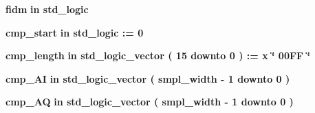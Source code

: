\begin{DoxyCompactItemize}
\item 
{\bf fidm}  {\bfseries {\bfseries \textcolor{keywordflow}{in}\textcolor{vhdlchar}{ }}} {\bfseries \textcolor{comment}{std\+\_\+logic}\textcolor{vhdlchar}{ }} 
\item 
{\bf cmp\+\_\+start}  {\bfseries {\bfseries \textcolor{keywordflow}{in}\textcolor{vhdlchar}{ }}} {\bfseries \textcolor{comment}{std\+\_\+logic}\textcolor{vhdlchar}{ }\textcolor{vhdlchar}{ }\textcolor{vhdlchar}{\+:}\textcolor{vhdlchar}{=}\textcolor{vhdlchar}{ }\textcolor{vhdlchar}{ }\textcolor{vhdlchar}{\textquotesingle{}}\textcolor{vhdlchar}{ } \textcolor{vhdldigit}{0} \textcolor{vhdlchar}{ }\textcolor{vhdlchar}{\textquotesingle{}}\textcolor{vhdlchar}{ }} 
\item 
{\bf cmp\+\_\+length}  {\bfseries {\bfseries \textcolor{keywordflow}{in}\textcolor{vhdlchar}{ }}} {\bfseries \textcolor{comment}{std\+\_\+logic\+\_\+vector}\textcolor{vhdlchar}{ }\textcolor{vhdlchar}{(}\textcolor{vhdlchar}{ }\textcolor{vhdlchar}{ } \textcolor{vhdldigit}{15} \textcolor{vhdlchar}{ }\textcolor{keywordflow}{downto}\textcolor{vhdlchar}{ }\textcolor{vhdlchar}{ } \textcolor{vhdldigit}{0} \textcolor{vhdlchar}{ }\textcolor{vhdlchar}{)}\textcolor{vhdlchar}{ }\textcolor{vhdlchar}{ }\textcolor{vhdlchar}{ }\textcolor{vhdlchar}{\+:}\textcolor{vhdlchar}{=}\textcolor{vhdlchar}{ }\textcolor{vhdlchar}{ }\textcolor{vhdlchar}{x}\textcolor{vhdlchar}{ }\textcolor{keyword}{\char`\"{} 00\+F\+F \char`\"{}}\textcolor{vhdlchar}{ }} 
\item 
{\bf cmp\+\_\+\+AI}  {\bfseries {\bfseries \textcolor{keywordflow}{in}\textcolor{vhdlchar}{ }}} {\bfseries \textcolor{comment}{std\+\_\+logic\+\_\+vector}\textcolor{vhdlchar}{ }\textcolor{vhdlchar}{(}\textcolor{vhdlchar}{ }\textcolor{vhdlchar}{ }\textcolor{vhdlchar}{ }\textcolor{vhdlchar}{ }{\bfseries {\bf smpl\+\_\+width}} \textcolor{vhdlchar}{-\/}\textcolor{vhdlchar}{ } \textcolor{vhdldigit}{1} \textcolor{vhdlchar}{ }\textcolor{keywordflow}{downto}\textcolor{vhdlchar}{ }\textcolor{vhdlchar}{ } \textcolor{vhdldigit}{0} \textcolor{vhdlchar}{ }\textcolor{vhdlchar}{)}\textcolor{vhdlchar}{ }} 
\item 
{\bf cmp\+\_\+\+AQ}  {\bfseries {\bfseries \textcolor{keywordflow}{in}\textcolor{vhdlchar}{ }}} {\bfseries \textcolor{comment}{std\+\_\+logic\+\_\+vector}\textcolor{vhdlchar}{ }\textcolor{vhdlchar}{(}\textcolor{vhdlchar}{ }\textcolor{vhdlchar}{ }\textcolor{vhdlchar}{ }\textcolor{vhdlchar}{ }{\bfseries {\bf smpl\+\_\+width}} \textcolor{vhdlchar}{-\/}\textcolor{vhdlchar}{ } \textcolor{vhdldigit}{1} \textcolor{vhdlchar}{ }\textcolor{keywordflow}{downto}\textcolor{vhdlchar}{ }\textcolor{vhdlchar}{ } \textcolor{vhdldigit}{0} \textcolor{vhdlchar}{ }\textcolor{vhdlchar}{)}\textcolor{vhdlchar}{ }} 

\end{DoxyCompactItemize}
